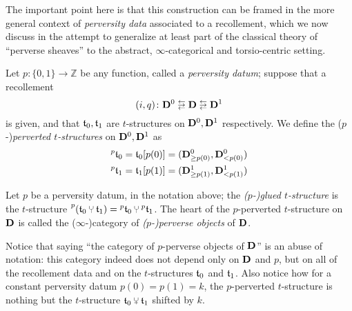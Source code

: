 \medskip 
The important point here is that this construction can be framed in the more general context of \emph{perversity data} associated to a recollement, which we now discuss in the attempt to generalize at least part of the classical theory of ``perverse sheaves'' to the abstract, $\infty$\hyp{}categorical and torsio\hyp{}centric setting.
\begin{definition}\label{def.perversity datum}
Let $p\colon \{0,1\}\to\mathbb Z$ be any function, called a \emph{perversity datum}; suppose that a recollement
$$(i,q)\colon \D^0 \lrlarrows  \D  \lrlarrows \D^1$$
is given, and that $\mathfrak{t}_0,\mathfrak{t}_1$ are $t$\hyp{}structures on $\mathbf{D}^0, \mathbf{D}^1$ respectively. We define the ($p$-)\emph{perverted $t$\hyp{}structures} on $\mathbf{D}^0,\mathbf{D}^1$ as
\begin{gather*}
\prescript{p}{}{\mathfrak{t}}_0 = \mathfrak{t}_0[p(0)] = (\mathbf{D}^0_{\ge p(0)}, \mathbf{D}^0_{<p(0)})\\
\prescript{p}{}{\mathfrak{t}}_1 = \mathfrak{t}_1[p(1)] = (\mathbf{D}^1_{\ge p(1)}, \mathbf{D}^1_{<p(1)})
\end{gather*}
\end{definition}
\begin{definition}
Let $p$ be a perversity datum, in the notation above; the \emph{($p$-)glued $t$\hyp{}structure} is the $t$\hyp{}structure $\prescript{p}{}{(\tee_0\glue\tee_1)} = \prescript{p}{}{\tee}_0\glue \prescript{p}{}{\tee}_1$. The heart of the $p$\hyp{}perverted $t$\hyp{}structure on $\mathbf{D}$ is called the ($\infty$-)category of \emph{($p$-)perverse objects} of $\mathbf{D}$.
\end{definition}
Notice that saying  ``the category of $p$\hyp{}perverse objects of $\mathbf{D}$'' is an abuse of notation: this category indeed does not depend only on $\mathbf{D}$ and $p$, but on all of the recollement data and on the $t$\hyp{}structures $\mathfrak{t}_0$ and $\mathfrak{t}_1$. Also notice how for a constant perversity datum $p(0)=p(1)=k$, the $p$\hyp{}perverted $t$\hyp{}structure is nothing but the $t$\hyp{}structure $\tee_0\glue\tee_1$ shifted by $k$.

\medskip 

